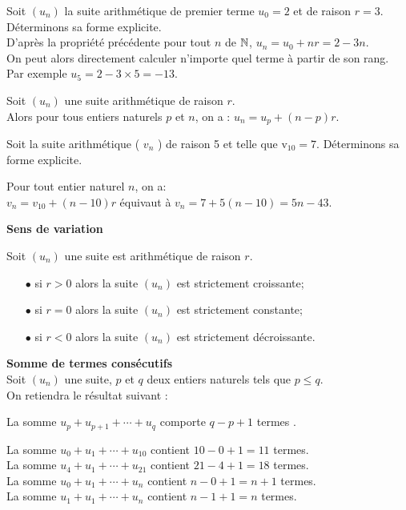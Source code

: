 \begin{example} 

 Soit $(u_{n})$ la suite  arithmétique  de premier terme $u_{0}=2 $ et de raison $ r=3$.\\ Déterminons sa forme explicite.\\ D'après la propriété précédente pour tout $n $ de $\mathbb{N} $, $ u_{n}=u_{0}+nr=2-3n $.\\ On peut alors directement calculer n'importe quel terme à partir de son rang.\\ Par exemple $ u_{5}=2-3\times5=-13 $.
\end{example}

 \begin{property}

   Soit $(u_{n})$ une  suite  arithmétique   de raison $ r $.\\ Alors pour tous   entiers naturels $ p $  et $ n $,  on a :\; $u_{n}= u_{p}+ (n-p)r $.
  \end{property}
   
\begin{example}


 Soit la suite arithmétique ( $v _n $ ) de raison 5 et telle que v$_{10} = 7$. Déterminons sa forme explicite.

Pour tout entier naturel $n$,\; on a:\\ $v _n = v _{10} + ( n -10 )r$ équivaut à  $ v_n = 7 + 5 ( n -10 ) = 5n - 43$.
  \end{example}
\textbf{Sens de variation}
 \begin{property}  Soit $(u_{n})$ une  suite est arithmétique  de raison $ r $.
  \begin{itemize}
  \item[$  \bullet$] si $ r>0 $ alors la suite  $(u_{n})$ est strictement croissante;
   \item[$  \bullet$] si $ r=0 $ alors la suite  $(u_{n})$ est strictement constante;
    \item[$  \bullet$] si $ r<0 $ alors la suite  $(u_{n})$ est strictement décroissante.
  \end{itemize}
  \end{property}
 
  \textbf{Somme de termes consécutifs}\\
  Soit $(u_{n})$ une  suite, $p$ et  $q $   deux entiers naturels tels que $ p\leq q $.\\ On retiendra le  résultat suivant :
  
  \bigskip
La somme $u_{p}+u_{p+1}+ \cdots + u_{q} $ comporte $q-p+1$ termes .
 \begin{example} 
 
 La somme $ u_{0}+u_{1}+ \cdots + u_{10} $ contient $ 10-0+1=11 $ termes.\\
 La somme $ u_{4}+u_{1}+ \cdots + u_{21} $ contient $ 21-4+1=18 $ termes.\\
 La somme $ u_{0}+u_{1}+ \cdots + u_{n} $ contient $ n-0+1=n+1 $ termes.\\
 La somme $ u_{1}+u_{1}+ \cdots + u_{n} $ contient $ n-1+1=n$ termes.
 \end{example}

